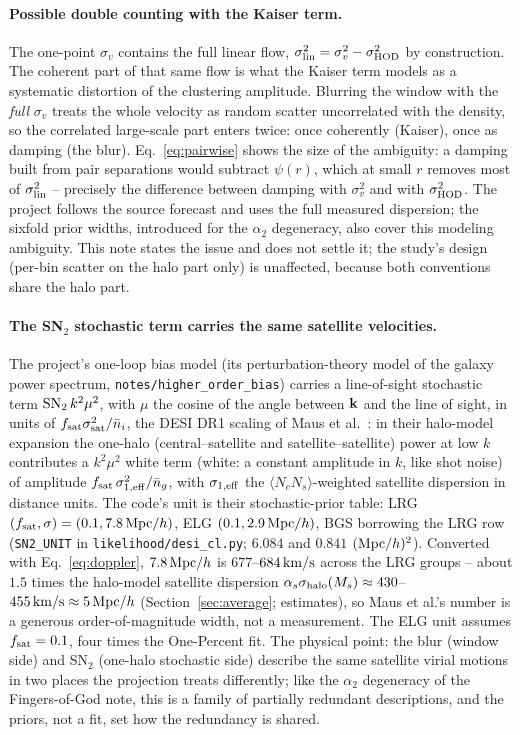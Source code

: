 \documentclass[11pt]{article}
\newcommand{\sv}{\sigma_v}
\newcommand{\slin}{\sigma_{\rm lin}}
\newcommand{\shod}{\sigma_{\rm HOD}}
\newcommand{\shalo}{\sigma_{\rm halo}}
\newcommand{\kms}{\,{\rm km/s}}
\newcommand{\Mpch}{\,{\rm Mpc}/h}
\newcommand{\us}{\_\allowbreak}
\begin{document}
\paragraph{Possible double counting with the Kaiser term.}
The one-point $\sv$ contains the full linear flow,
$\slin^2 = \sv^2 - \shod^2$ by construction.  The coherent part of
that same flow is what the Kaiser term models as a systematic
distortion of the clustering amplitude.  Blurring the window with the
\emph{full} $\sv$ treats the whole velocity as random scatter
uncorrelated with the density, so the correlated large-scale part
enters twice: once coherently (Kaiser), once as damping (the blur).
Eq.~\eqref{eq:pairwise} shows the size of the ambiguity: a damping
built from pair separations would subtract $\psi(r)$, which at small
$r$ removes most of $\slin^2$ -- precisely the difference between
damping with $\sv^2$ and with $\shod^2$.  The project follows the
source forecast and uses the full measured dispersion; the sixfold
prior widths, introduced for the $\alpha_2$ degeneracy, also cover
this modeling ambiguity.  This note states the issue and does not
settle it; the study's design (per-bin scatter on the halo part only)
is unaffected, because both conventions share the halo part.

\paragraph{The SN$_2$ stochastic term carries the same satellite
velocities.}
The project's one-loop bias model (its perturbation-theory model of
the galaxy power spectrum, \texttt{notes/higher\us order\us bias})
carries a line-of-sight stochastic term
${\rm SN}_2\,k^2\mu^2$, with $\mu$ the cosine of the angle between
${\bf k}$ and the line of sight, in units of
$f_{\rm sat}\sigma_{\rm sat}^2/\bar{n}_i$, the DESI DR1 scaling of
Maus et al.~\cite{Maus2024}: in their halo-model expansion the
one-halo (central--satellite and satellite--satellite) power at low
$k$ contributes a $k^2\mu^2$ white term (white: a constant amplitude
in $k$, like shot noise) of amplitude
$f_{\rm sat}\,\sigma_{1,\rm eff}^2/\bar{n}_g$, with
$\sigma_{1,\rm eff}$ the $\langle N_c N_s\rangle$-weighted satellite
dispersion in distance units.  The code's unit is their
stochastic-prior table: LRG $(f_{\rm sat}, \sigma) = (0.1,
7.8\Mpch)$, ELG $(0.1, 2.9\Mpch)$, BGS borrowing the LRG row
(\texttt{SN2\us UNIT} in \texttt{likelihood/desi\us cl.py}; $6.084$
and $0.841$ $({\rm Mpc}/h)^2$).  Converted with
Eq.~\eqref{eq:doppler}, $7.8\Mpch$ is $677$--$684\kms$ across the LRG
groups -- about $1.5$ times the halo-model satellite dispersion
$\alpha_s\shalo(M_s) \approx 430$--$455\kms \approx 5\Mpch$
(Section~\ref{sec:average}; estimates), so Maus et al.'s number is a
generous order-of-magnitude width, not a measurement.  The ELG unit
assumes $f_{\rm sat} = 0.1$, four times the One-Percent fit.  The
physical point: the blur (window side) and SN$_2$ (one-halo
stochastic side) describe the same satellite virial motions in two
places the projection treats differently; like the $\alpha_2$
degeneracy of the Fingers-of-God note, this is a family of partially
redundant descriptions, and the priors, not a fit, set how the
redundancy is shared.
\end{document}
